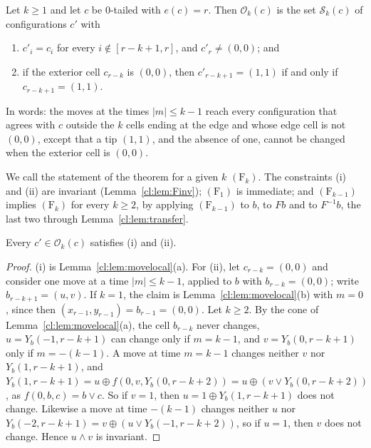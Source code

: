 \begin{theorem}\label{cl:thm:Fk}
Let $k\ge1$ and let $c$ be $0$-tailed with $e(c)=r$. Then $\mathcal O_k(c)$ is the set $\mathcal S_k(c)$ of configurations $c'$ with
\begin{enumerate}
\item[(i)] $c'_i=c_i$ for every $i\notin[r-k+1,r]$, and $c'_r\ne(0,0)$; and
\item[(ii)] if the exterior cell $c_{r-k}$ is $(0,0)$, then $c'_{r-k+1}=(1,1)$ if and only if $c_{r-k+1}=(1,1)$.
\end{enumerate}
In words: the moves at the times $|m|\le k-1$ reach every configuration that agrees with $c$ outside the $k$ cells ending at the edge and whose edge cell is not $(0,0)$, except that a tip $(1,1)$, and the absence of one, cannot be changed when the exterior cell is $(0,0)$.
\end{theorem}

We call the statement of the theorem for a given $k$ $(\mathrm F_k)$. The constraints (i) and (ii) are invariant (Lemma~\ref{cl:lem:Finv}); $(\mathrm F_1)$ is immediate; and $(\mathrm F_{k-1})$ implies $(\mathrm F_k)$ for every $k\ge2$, by applying $(\mathrm F_{k-1})$ to $b$, to $Fb$ and to $F^{-1}b$, the last two through Lemma~\ref{cl:lem:transfer}.

\begin{lemma}[invariance]\label{cl:lem:Finv}
Every $c'\in\mathcal O_k(c)$ satisfies (i) and (ii).
\end{lemma}

\begin{proof}
(i) is Lemma~\ref{cl:lem:movelocal}(a). For (ii), let $c_{r-k}=(0,0)$ and consider one move at a time $|m|\le k-1$, applied to $b$ with $b_{r-k}=(0,0)$; write $b_{r-k+1}=(u,v)$. If $k=1$, the claim is Lemma~\ref{cl:lem:movelocal}(b) with $m=0$, since then $(x_{r-1},y_{r-1})=b_{r-1}=(0,0)$. Let $k\ge2$. By the cone of Lemma~\ref{cl:lem:movelocal}(a), the cell $b_{r-k}$ never changes, $u=Y_b(-1,r-k+1)$ can change only if $m=k-1$, and $v=Y_b(0,r-k+1)$ only if $m=-(k-1)$. A move at time $m=k-1$ changes neither $v$ nor $Y_b(1,r-k+1)$, and $Y_b(1,r-k+1)=u\oplus f(0,v,Y_b(0,r-k+2))=u\oplus(v\vee Y_b(0,r-k+2))$, as $f(0,b,c)=b\vee c$. So if $v=1$, then $u=1\oplus Y_b(1,r-k+1)$ does not change. Likewise a move at time $-(k-1)$ changes neither $u$ nor $Y_b(-2,r-k+1)=v\oplus(u\vee Y_b(-1,r-k+2))$, so if $u=1$, then $v$ does not change. Hence $u\wedge v$ is invariant.
\end{proof}

